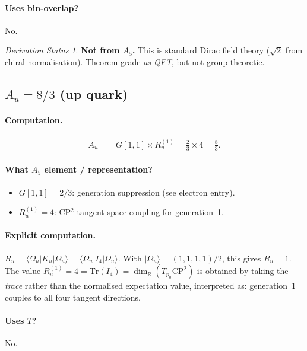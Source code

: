\documentclass[11pt]{article}
\theoremstyle{remark}
\newtheorem*{status}{Derivation Status}
\begin{document}
\paragraph{Uses bin-overlap?} No.

\begin{status}
\textbf{Not from $A_5$.}
This is standard Dirac field theory ($\sqrt{2}$ from chiral normalisation).
Theorem-grade \emph{as QFT}, but not group-theoretic.
\end{status}

\subsection{$A_u = 8/3$ \quad (up quark)}

\paragraph{Computation.}
\begin{align}
A_u &= G[1,1] \times R_u^{(1)} = \frac{2}{3} \times 4 = \frac{8}{3}.
\end{align}

\paragraph{What $A_5$ element / representation?}
\begin{itemize}[nosep]
  \item $G[1,1] = 2/3$: generation suppression (see electron entry).
  \item $R_u^{(1)} = 4$: CP$^2$ tangent-space coupling for generation~1.
\end{itemize}

\paragraph{Explicit computation.}
$R_u = \langle \Omega_u | K_u | \Omega_u \rangle = \langle \Omega_u | I_4 | \Omega_u \rangle$.
With $|\Omega_u\rangle = (1,1,1,1)/2$, this gives $R_u = 1$.
The value $R_u^{(1)} = 4 = \mathrm{Tr}(I_4) = \dim_{\mathbb{R}}(T_{p_0}\mathrm{CP}^2)$ is obtained by taking the \emph{trace} rather than the normalised expectation value, interpreted as: generation~1 couples to all four tangent directions.

\paragraph{Uses $T$?} No.
\end{document}
